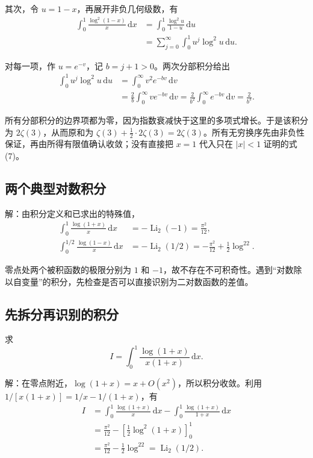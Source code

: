 \documentclass[11pt,a4paper]{article}
\begin{document}
其次，令 \(u=1-x\)，再展开非负几何级数，有
\[
\begin{aligned}
\int_0^1\frac{\log^2(1-x)}x\,\mathrm dx
&=\int_0^1\frac{\log^2u}{1-u}\,\mathrm du\\
&=\sum_{j=0}^{\infty}\int_0^1u^j\log^2u\,\mathrm du.
\end{aligned}
\]

对每一项，作 \(u=e^{-v}\)，记 \(b=j+1>0\)。两次分部积分给出
\[
\begin{aligned}
\int_0^1u^j\log^2u\,\mathrm du
&=\int_0^{\infty}v^2e^{-bv}\,\mathrm dv\\
&=\frac2b\int_0^{\infty}ve^{-bv}\,\mathrm dv
=\frac2{b^2}\int_0^{\infty}e^{-bv}\,\mathrm dv
=\frac2{b^3}.
\end{aligned}
\]

所有分部积分的边界项都为零，因为指数衰减快于这里的多项式增长。于是该积分为
\(2\zeta(3)\)，从而原和为
\(\zeta(3)+\tfrac12\cdot2\zeta(3)=2\zeta(3)\)。所有无穷换序先由非负性保证，再由所得有限值确认收敛；没有直接把
\(x=1\) 代入只在 \(|x|<1\) 证明的式 (7)。

\hypertarget{ux4e24ux4e2aux5178ux578bux5bf9ux6570ux79efux5206}{%
\subsection{两个典型对数积分}\label{ux4e24ux4e2aux5178ux578bux5bf9ux6570ux79efux5206}}

解：由积分定义和已求出的特殊值，
\[
\begin{aligned}
\int_0^1\frac{\log(1+x)}x\,\mathrm dx
&=-\operatorname{Li}_2(-1)=\frac{\pi^2}{12},\\
\int_0^{1/2}\frac{\log(1-x)}x\,\mathrm dx
&=-\operatorname{Li}_2(1/2)=-\frac{\pi^2}{12}+\frac12\log^22.
\end{aligned}
\]

零点处两个被积函数的极限分别为 \(1\) 和
\(-1\)，故不存在不可积奇性。遇到``对数除以自变量''的积分，先检查是否可以直接识别为二对数函数的差值。

\hypertarget{ux5148ux62c6ux5206ux518dux8bc6ux522bux7684ux79efux5206}{%
\subsection{先拆分再识别的积分}\label{ux5148ux62c6ux5206ux518dux8bc6ux522bux7684ux79efux5206}}

求
\[
I=\int_0^1\frac{\log(1+x)}{x(1+x)}\,\mathrm dx.
\]

解：在零点附近，\(\log(1+x)=x+O(x^2)\)，所以积分收敛。利用
\(1/[x(1+x)]=1/x-1/(1+x)\)，有
\[
\begin{aligned}
I&=\int_0^1\frac{\log(1+x)}x\,\mathrm dx
-\int_0^1\frac{\log(1+x)}{1+x}\,\mathrm dx\\
&=\frac{\pi^2}{12}-\left[\frac12\log^2(1+x)\right]_0^1\\
&=\frac{\pi^2}{12}-\frac12\log^22
=\operatorname{Li}_2(1/2).
\end{aligned}
\]
\end{document}
